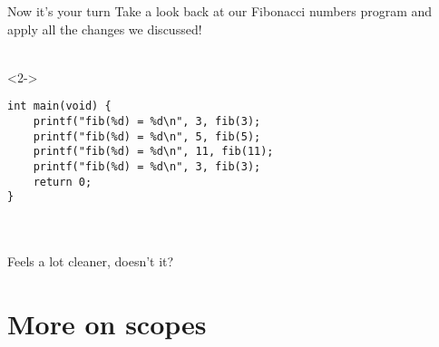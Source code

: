 \begin{frame}[fragile]{Now it's your turn}
	Take a look back at our Fibonacci numbers program and apply all the changes we discussed! \ \\ \ \\
	\begin{uncoverenv}<2->
		\begin{lstlisting}
int main(void) {
	printf("fib(%d) = %d\n", 3, fib(3);
	printf("fib(%d) = %d\n", 5, fib(5);
	printf("fib(%d) = %d\n", 11, fib(11);
	printf("fib(%d) = %d\n", 3, fib(3);
	return 0;
}
\end{lstlisting} \ \\ \ \\
		Feels a lot cleaner, doesn't it?
	\end{uncoverenv}
\end{frame}
\section{More on scopes}
